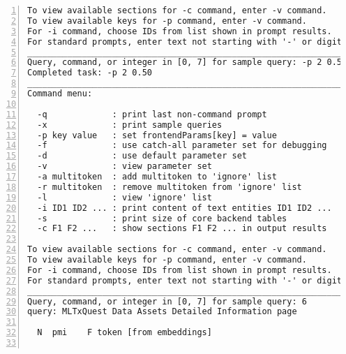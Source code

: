 \documentclass[10pt]{article}
\begin{document}
{\begin{lstlisting}[numbers=left,basicstyle=\ttfamily\footnotesize, frame=none]
To view available sections for -c command, enter -v command.
To view available keys for -p command, enter -v command.
For -i command, choose IDs from list shown in prompt results.
For standard prompts, enter text not starting with '-' or digit.
____________________________________________________________________
Query, command, or integer in [0, 7] for sample query: -p 2 0.50
Completed task: -p 2 0.50
____________________________________________________________________
Command menu:

  -q             : print last non-command prompt
  -x             : print sample queries
  -p key value   : set frontendParams[key] = value
  -f             : use catch-all parameter set for debugging
  -d             : use default parameter set
  -v             : view parameter set
  -a multitoken  : add multitoken to 'ignore' list
  -r multitoken  : remove multitoken from 'ignore' list
  -l             : view 'ignore' list
  -i ID1 ID2 ... : print content of text entities ID1 ID2 ...
  -s             : print size of core backend tables
  -c F1 F2 ...   : show sections F1 F2 ... in output results

To view available sections for -c command, enter -v command.
To view available keys for -p command, enter -v command.
For -i command, choose IDs from list shown in prompt results.
For standard prompts, enter text not starting with '-' or digit.
____________________________________________________________________
Query, command, or integer in [0, 7] for sample query: 6
query: MLTxQuest Data Assets Detailed Information page

  N  pmi    F token [from embeddings]                                   word [from prompt]


\end{lstlisting}}
\end{document}
